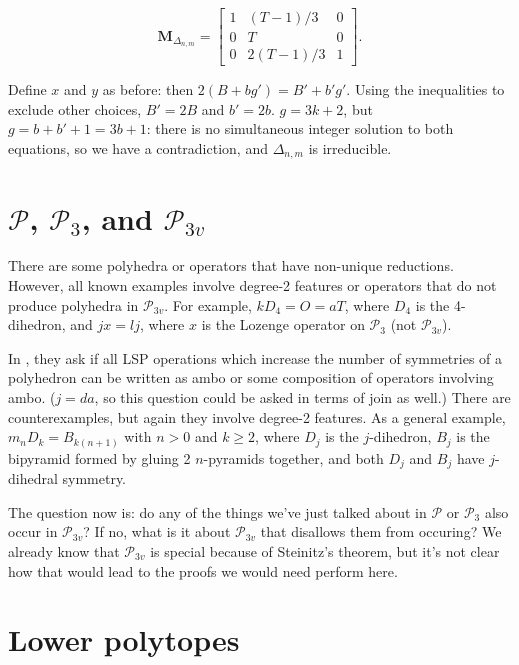 \documentclass{amsart}[12pt]
\begin{document}
\begin{equation}
   \mathbf{M}_{\Delta_{n,m}} = \begin{bmatrix}
          1 & (T-1)/3 & 0 \\
          0 & T & 0 \\
          0 & 2(T-1)/3 & 1 \end{bmatrix}.
\end{equation}

Define $x$ and $y$ as before: then $2(B+bg') = B'+b'g'$. Using the
inequalities to exclude other choices, $B' = 2B$ and $b' = 2b$.
$g = 3k + 2$, but $g = b+ b' + 1 = 3b+1$:
there is no simultaneous integer solution to both equations,
so we have a contradiction, and $\Delta_{n,m}$ is irreducible.

\section{$\mathcal{P}$, $\mathcal{P}_{3}$, and $\mathcal{P}_{3v}$}

There are some polyhedra or operators that have non-unique reductions.
However, all known examples involve degree-2 features or operators that
do not produce polyhedra in $\mathcal{P}_{3v}$. For example,
$kD_4 = O = aT$, where $D_4$ is the 4-dihedron, and $jx = lj$, where
$x$ is the Lozenge operator on $\mathcal{P}_{3}$ (not $\mathcal{P}_{3v}$).

In \cite{brinkmann}, they ask if all LSP operations which increase the number
of symmetries of a polyhedron can be written as ambo or some composition of
operators involving ambo. ($j=da$, so this question could be asked in terms of
join as well.) There are counterexamples, but again they involve degree-2
features. As a general example, $m_n D_k = B_{k(n+1)}$ with $n>0$ and
$k\ge 2$, where $D_j$ is the $j$-dihedron,
$B_j$ is the bipyramid formed by gluing 2 $n$-pyramids together,
and both $D_j$ and $B_j$ have $j$-dihedral symmetry.

The question now is: do any of the things we've just talked about in
$\mathcal{P}$ or $\mathcal{P}_{3}$ also occur in $\mathcal{P}_{3v}$? If no,
what is it about $\mathcal{P}_{3v}$ that disallows them from occuring? We
already know that $\mathcal{P}_{3v}$ is special because of Steinitz's theorem,
but it's not clear how that would lead to the proofs we would need perform
here.

\section{Lower polytopes}
\end{document}
